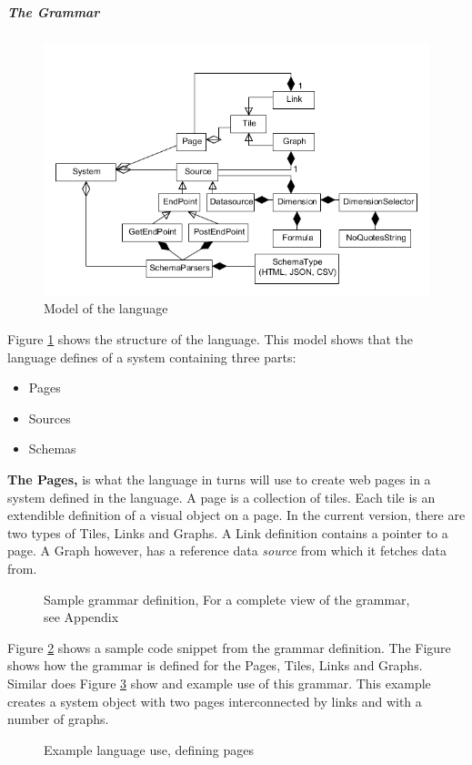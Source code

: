 \subparagraph{The Grammar}
\begin{figure}
\begin{center}
\includegraphics[width=\linewidth]{images/languagemodel}
\end{center}
\caption{Model of the language}
\label{fig:languagemodel}
\end{figure}
Figure \ref{fig:languagemodel} shows the structure of the language.
This model shows that the language defines of a system containing three parts:
\begin{itemize}
\item Pages
\item Sources
\item Schemas
\end{itemize}

\textbf{The Pages,} is what the language in turns will use to create web pages in a system
defined in the language.
A page is a collection of tiles. 
Each tile is an extendible definition of a visual object on a page.
In the current version, there are two types of Tiles, Links and Graphs.
A Link definition contains a pointer to a page. 
A Graph however, has a reference data \textit{source} from which it fetches data from.
\begin{figure}
\begin{center}

\end{center}
\caption{Sample grammar definition, For a complete view of the grammar, see Appendix }
\label{fig:grammadefinition}
\end{figure}
Figure \ref{fig:grammadefinition} shows a sample code snippet from the grammar definition.
The Figure shows how the grammar is defined for the Pages, Tiles, Links and Graphs.
Similar does Figure \ref{fig:examplePages} show and example use of this grammar. 
This example creates a system object with two pages interconnected by links and with a number
of graphs.
\begin{figure}
\begin{center}

\end{center}
\caption{Example language use, defining pages}
\label{fig:examplePages}
\end{figure}

